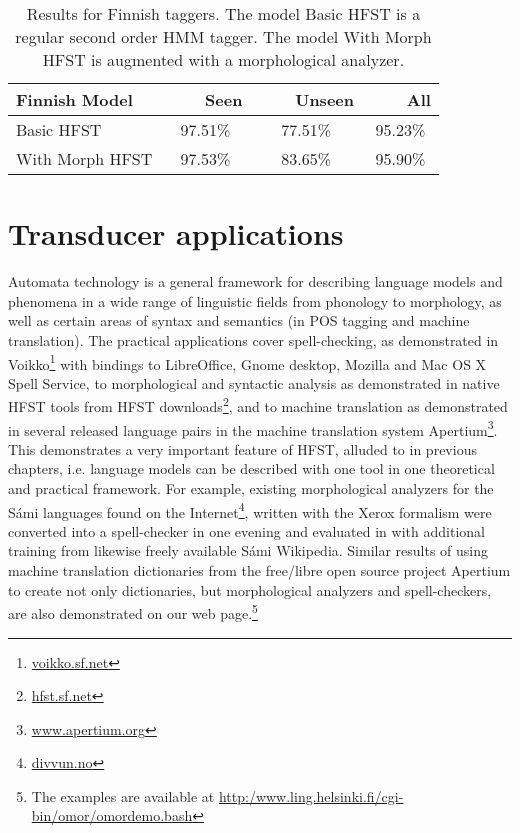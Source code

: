 \documentclass{llncs}
\begin{document}
\begin{table}
  \caption{Results for Finnish taggers. The model Basic HFST is a
    regular second order HMM tagger. The model With Morph HFST is
    augmented with a morphological analyzer.}\label{fin-tagging-acc}
  \begin{center}
    \begin{tabular}{lccc}
      \hline 
      Finnish Model            & ~~~~Seen & ~~~~Unseen & ~~~~All \\
      \hline 
      Basic HFST       &  97.51\% &    77.51\% & 95.23\% \\
      With Morph HFST  &  97.53\% &    83.65\% & 95.90\% \\
      \hline
    \end{tabular}
  \end{center}
\end{table}


\section{Transducer applications}\label{Applications}



Automata technology is a general framework for describing language models
and phenomena in a wide range of linguistic fields from phonology to
morphology, as well as certain areas of syntax and semantics (in POS tagging and
machine translation).  The practical applications cover spell-checking, 
as demonstrated in Voikko\footnote{\url{voikko.sf.net}} with
bindings to LibreOffice, Gnome desktop, Mozilla and Mac OS X Spell Service, to
morphological and syntactic analysis as demonstrated in native HFST tools
from HFST downloads\footnote{\url{hfst.sf.net}}, and to machine translation as demonstrated in
several released language pairs in the machine translation system
Apertium\footnote{\url{www.apertium.org}}. This demonstrates a very important feature of HFST,
alluded to in previous chapters, i.e. language models can be
described with one tool in one theoretical and practical framework. For example,
existing morphological analyzers for the Sámi languages found on the
Internet\footnote{\url{divvun.no}}, written with the Xerox formalism were converted into a spell-checker 
in one evening and evaluated in \cite{pirinen/2010/lrec} with additional training from likewise freely
available Sámi Wikipedia. Similar results of using machine translation
dictionaries from the free/libre open source project
Apertium to create not only
dictionaries, but morphological analyzers and spell-checkers, are also
demonstrated on our web page.\footnote{The examples are available at
  \url{http:/www.ling.helsinki.fi/cgi-bin/omor/omordemo.bash}}
\end{document}
